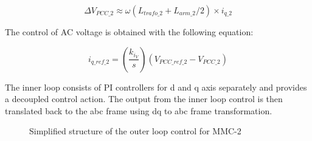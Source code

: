 \begin{equation}
   \Delta V_{PCC\_2} \approx \omega(L_{trafo\_2}+L_{arm\_2}/2)\times i_{q\_2}
\end{equation}

The control of \gls{AC} voltage is obtained with the following equation:

\begin{equation}
    i_{q\_ref\_2} =  \left(\frac{k_{i_V}}{s}\right)\left(V_{PCC\_{ref}\_2}-V_{PCC\_2}\right)
\end{equation}

The inner loop consists of \gls{PI} controllers for d and q axis separately and provides a decoupled control action. The output from the inner loop control is then translated back to the abc frame using \gls{dq} to abc frame transformation. 

\begin{figure}[H]
\centering


\vspace{10mm}


\caption{Simplified structure of the outer loop control for MMC-2 \cite{saad2015modelisation}}

\end{figure}

